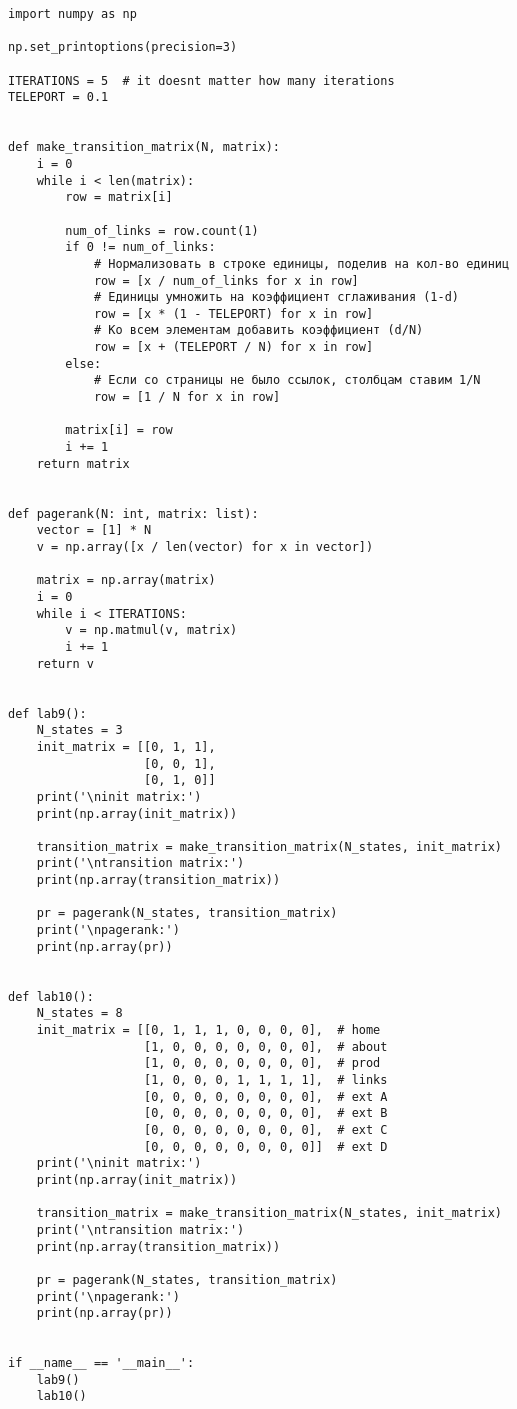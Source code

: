 \documentclass[12pt]{article}
\begin{document}
\begin{verbatim}
import numpy as np

np.set_printoptions(precision=3)

ITERATIONS = 5  # it doesnt matter how many iterations
TELEPORT = 0.1


def make_transition_matrix(N, matrix):
    i = 0
    while i < len(matrix):
        row = matrix[i]

        num_of_links = row.count(1)
        if 0 != num_of_links:
            # Нормализовать в строке единицы, поделив на кол-во единиц
            row = [x / num_of_links for x in row]
            # Единицы умножить на коэффициент сглаживания (1-d)
            row = [x * (1 - TELEPORT) for x in row]
            # Ко всем элементам добавить коэффициент (d/N)
            row = [x + (TELEPORT / N) for x in row]
        else:
            # Если со страницы не было ссылок, столбцам ставим 1/N
            row = [1 / N for x in row]

        matrix[i] = row
        i += 1
    return matrix


def pagerank(N: int, matrix: list):
    vector = [1] * N
    v = np.array([x / len(vector) for x in vector])

    matrix = np.array(matrix)
    i = 0
    while i < ITERATIONS:
        v = np.matmul(v, matrix)
        i += 1
    return v


def lab9():
    N_states = 3
    init_matrix = [[0, 1, 1],
                   [0, 0, 1],
                   [0, 1, 0]]
    print('\ninit matrix:')
    print(np.array(init_matrix))

    transition_matrix = make_transition_matrix(N_states, init_matrix)
    print('\ntransition matrix:')
    print(np.array(transition_matrix))

    pr = pagerank(N_states, transition_matrix)
    print('\npagerank:')
    print(np.array(pr))


def lab10():
    N_states = 8
    init_matrix = [[0, 1, 1, 1, 0, 0, 0, 0],  # home
                   [1, 0, 0, 0, 0, 0, 0, 0],  # about
                   [1, 0, 0, 0, 0, 0, 0, 0],  # prod
                   [1, 0, 0, 0, 1, 1, 1, 1],  # links
                   [0, 0, 0, 0, 0, 0, 0, 0],  # ext A
                   [0, 0, 0, 0, 0, 0, 0, 0],  # ext B
                   [0, 0, 0, 0, 0, 0, 0, 0],  # ext C
                   [0, 0, 0, 0, 0, 0, 0, 0]]  # ext D
    print('\ninit matrix:')
    print(np.array(init_matrix))

    transition_matrix = make_transition_matrix(N_states, init_matrix)
    print('\ntransition matrix:')
    print(np.array(transition_matrix))

    pr = pagerank(N_states, transition_matrix)
    print('\npagerank:')
    print(np.array(pr))


if __name__ == '__main__':
    lab9()
    lab10()
\end{verbatim}
  
\end{document}

